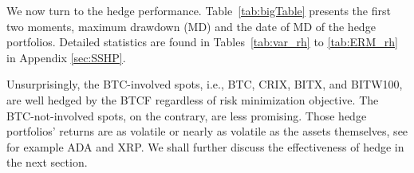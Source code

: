 We now turn to the hedge performance. Table~\ref{tab:bigTable}
presents the first two moments, maximum drawdown (MD) and the date of
MD of the hedge portfolios.  Detailed statistics are found in
Tables~\ref{tab:var_rh} to \ref{tab:ERM_rh} in Appendix
\ref{sec:SSHP}. 
 
Unsurprisingly, the BTC-involved spots, i.e., BTC, CRIX, BITX, and
BITW100, are well hedged by the BTCF regardless of risk minimization
objective. 
The BTC-not-involved spots, on the contrary, are less promising. Those
hedge portfolios' returns are as volatile or nearly as volatile as the
assets themselves, see for example ADA and XRP. 
We shall further discuss the effectiveness of hedge in the next
section. %

